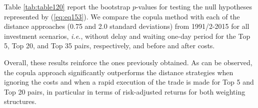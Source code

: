 \documentclass[a4paper]{article}
\begin{document}
	Table \ref{tab:table120} report the bootstrap $p$-values for testing the null hypotheses represented by (\ref{eq:eq153}). We compare the copula method with each of the distance approaches (0.75 and 2.0 standard deviations) from 1991/2-2015 for all investment scenarios, \emph{i.e.}, without delay and waiting one-day period for the Top 5, Top 20, and Top 35 pairs, respectively, and before and after costs.
	
	Overall, these results reinforce the ones previously obtained. As can be observed, the copula approach significantly outperforms the distance strategies when ignoring the costs and when a rapid execution of the trade is made for Top 5 and Top 20 pairs, in particular in terms of risk-adjusted returns for both weighting structures.

	

	\medskip
	
\end{document}
